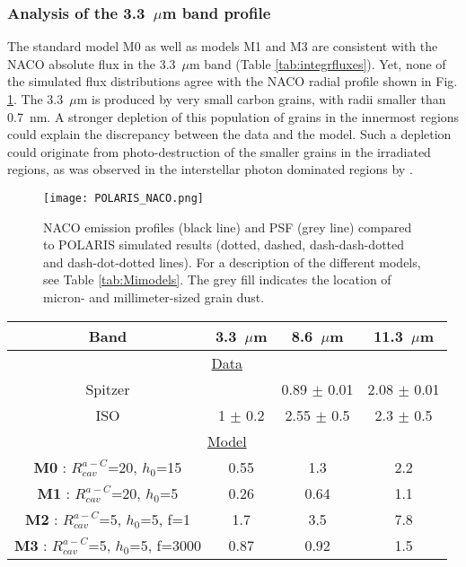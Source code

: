 \documentclass{aa}
\newcommand{\mic}{~$\mu$m\xspace}
\begin{document}
\subsubsection{Analysis of the 3.3\mic band profile}
The standard model M0 as well as models M1 and M3 are consistent with the NACO absolute flux in the 3.3\mic band (Table \ref{tab:integrfluxes}). Yet, none of the simulated flux distributions agree with the NACO radial profile shown in Fig. \ref{fig:POLNACO}. The 3.3\mic is produced by very small carbon grains, with radii smaller than 0.7~nm. A stronger depletion of this population of grains in the innermost regions could explain the discrepancy between the data and the model. Such a depletion could originate from photo-destruction of the smaller grains in the irradiated regions, as was observed in the interstellar photon dominated regions by \citet{Schirmer2020}.

\begin{figure}[ht]
    \centering
    \texttt{[image: POLARIS\_NACO.png]}
    \caption{NACO emission profiles (black line) and PSF (grey line) compared to POLARIS simulated results (dotted, dashed, dash-dash-dotted and dash-dot-dotted lines). For a description of the different models, see Table \ref{tab:Mimodels}. The grey fill indicates the location of micron- and millimeter-sized grain dust.}
    \label{fig:POLNACO}
\end{figure}

\begin{table*}[ht]
    \centering
    \caption{Continuum-subtracted band fluxes in $10^{-14}\,W.m^{-2}$, integrated over the disk in the three aromatic bands, computed for the different the POLARIS models. The modelled values are compared to the fluxes computed on ISO data \citep{Acke2004} and Spitzer data \citep{Acke2010}.}
    \label{tab:integrfluxes}
    \begin{tabular}{cccc}
        \hline
        Band &3.3\mic&8.6\mic &11.3\mic \\
        \hline
        \multicolumn{4}{c}{\underline{Data}}\\
        Spitzer&&0.89 $\pm$ 0.01&2.08 $\pm$ 0.01\\
        ISO&1 $\pm$ 0.2&2.55 $\pm$ 0.5&2.3 $\pm$ 0.5\\
        \multicolumn{4}{c}{\underline{Model}}\\
        \textbf{M0} : $R_{cav}^{a-C}$=20, $h_0$=15&0.55&1.3&2.2\\
        \textbf{M1} : $R_{cav}^{a-C}$=20, $h_0$=5&0.26&0.64&1.1\\
        \textbf{M2} : $R_{cav}^{a-C}$=5, $h_0$=5, f=1&1.7&3.5&7.8\\
        \textbf{M3} : $R_{cav}^{a-C}$=5, $h_0$=5, f=3000&0.87&0.92&1.5\\
        \hline
    \end{tabular}
\end{table*}
\end{document}
